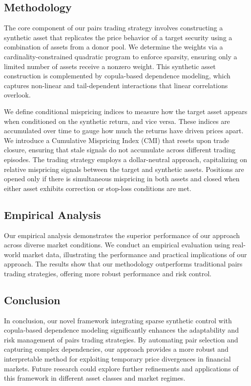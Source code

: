 \documentclass[12pt,a4paper]{article}
\begin{document}
\subsection*{Methodology}

The core component of our pairs trading strategy involves constructing a synthetic asset that replicates the price behavior of a target security using a combination of assets from a donor pool. We determine the weights via a cardinality-constrained quadratic program to enforce sparsity, ensuring only a limited number of assets receive a nonzero weight. This synthetic asset construction is complemented by copula-based dependence modeling, which captures non-linear and tail-dependent interactions that linear correlations overlook.

We define conditional mispricing indices to measure how  the target asset appears when conditioned on the synthetic return, and vice versa. These indices are accumulated over time to gauge how much the returns have driven prices apart. We introduce a Cumulative Mispricing Index (CMI) that resets upon trade closure, ensuring that stale signals do not accumulate across different trading episodes. The trading strategy employs a dollar-neutral approach, capitalizing on relative mispricing signals between the target and synthetic assets. Positions are opened only if there is simultaneous mispricing in both assets and closed when either asset exhibits correction or stop-loss conditions are met.

\subsection*{Empirical Analysis}

Our empirical analysis demonstrates the superior performance of our approach across diverse market conditions. We conduct an empirical evaluation using real-world market data, illustrating the performance and practical implications of our approach. The results show that our methodology outperforms traditional pairs trading strategies, offering more robust performance and risk control.

\subsection*{Conclusion}

In conclusion, our novel framework integrating sparse synthetic control with copula-based dependence modeling significantly enhances the adaptability and risk management of pairs trading strategies. By automating pair selection and capturing complex dependencies, our approach provides a more robust and interpretable method for exploiting temporary price divergences in financial markets. Future research could explore further refinements and applications of this framework in different asset classes and market regimes.
\end{document}
